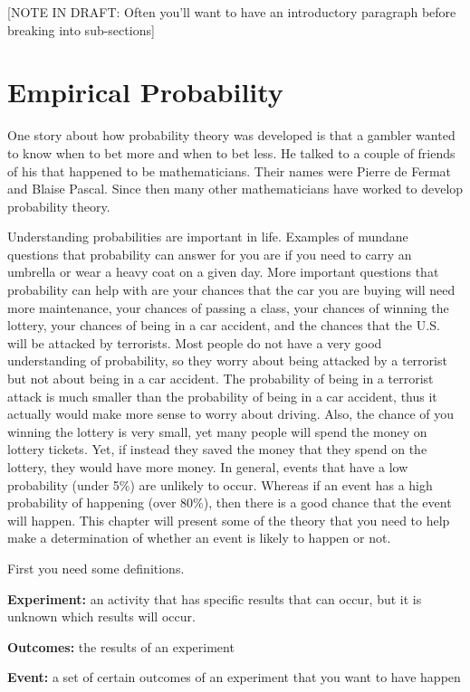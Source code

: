 \documentclass[]{book}
\begin{document}
{[}NOTE IN DRAFT: Often you'll want to have an introductory paragraph before breaking into sub-sections{]}

\hypertarget{empirical-probability}{%
\section{Empirical Probability}\label{empirical-probability}}

One story about how probability theory was developed is that a gambler wanted to know when to bet more and when to bet less. He talked to a couple of friends of his that happened to be mathematicians. Their names were Pierre de Fermat and Blaise Pascal. Since then many other mathematicians have worked to develop probability theory.

Understanding probabilities are important in life. Examples of mundane questions that probability can answer for you are if you need to carry an umbrella or wear a heavy coat on a given day. More important questions that probability can help with are your chances that the car you are buying will need more maintenance, your chances of passing a class, your chances of winning the lottery, your chances of being in a car accident, and the chances that the U.S. will be attacked by terrorists. Most people do not have a very good understanding of probability, so they worry about being attacked by a terrorist but not about being in a car accident. The probability of being in a terrorist attack is much smaller than the probability of being in a car accident, thus it actually would make more sense to worry about driving. Also, the chance of you winning the lottery is very small, yet many people will spend the money on lottery tickets. Yet, if instead they saved the money that they spend on the lottery, they would have more money. In general, events that have a low probability (under 5\%) are unlikely to occur. Whereas if an event has a high probability of happening (over 80\%), then there is a good chance that the event will happen. This chapter will present some of the theory that you need to help make a determination of whether an event is likely to happen or not.

First you need some definitions.

\textbf{Experiment:} an activity that has specific results that can occur, but it is unknown which results will occur.

\textbf{Outcomes:} the results of an experiment

\textbf{Event:} a set of certain outcomes of an experiment that you want to have happen
\end{document}
